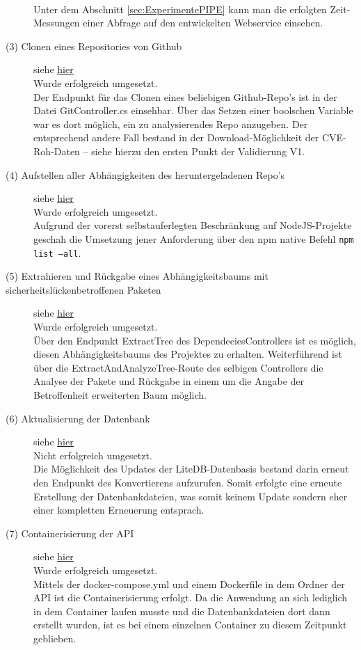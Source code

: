 \begin{description}
            \\
            Unter dem Abschnitt \ref{sec:ExperimentePIPE}  kann man die erfolgten Zeit-Messungen einer Abfrage auf den entwickelten Webservice einsehen.
        \item[(3) Clonen eines Repositories von Github] siehe \hyperref[f:three]{\underline{hier}} \hfill \\
            Wurde erfolgreich umgesetzt.
            \\
            Der Endpunkt für das Clonen eines beliebigen Github-Repo's ist in der Datei GitController.cs einsehbar.
            Über das Setzen einer boolschen Variable war es dort möglich, ein zu analysierendes Repo anzugeben.
            Der entsprechend andere Fall bestand in der Download-Möglichkeit der \ac{CVE}-Roh-Daten -- siehe hierzu den ersten Punkt der Validierung V1.
        \item[(4) Aufstellen aller Abhängigkeiten des heruntergeladenen Repo's] siehe \hyperref[f:four]{\underline{hier}} \hfill \\
            Wurde erfolgreich umgesetzt.
            \\
            Aufgrund der vorerst selbstauferlegten Beschränkung auf NodeJS-Projekte geschah die Umsetzung jener Anforderung über den npm native Befehl \texttt{npm list --all}.
        \item[(5) Extrahieren und Rückgabe eines Abhängigkeitsbaums mit sicher\-heits\-lücken\-betroffenen Paketen] siehe \hyperref[f:five]{\underline{hier}} \hfill \\
            Wurde erfolgreich umgesetzt.
            \\
            Über den Endpunkt ExtractTree des DependeciesControllers ist es möglich, diesen Abhängig\-keitsbaums des Projektes zu erhalten.
            Weiterführend ist über die ExtractAndAnalyzeTree-Route des selbigen Controllers die Analyse der Pakete und Rückgabe in einem um die Angabe der Betroffenheit erweiterten Baum möglich.
        \item[(6) Aktualisierung der Datenbank] siehe \hyperref[f:six]{\underline{hier}} \hfill \\
            Nicht erfolgreich umgesetzt.
            \\
            Die Möglichkeit des Updates der LiteDB-Datenbasis bestand darin erneut den Endpunkt des Konvertierens aufzurufen.
            Somit erfolgte eine erneute Erstellung der Datenbankdateien, was somit keinem Update sondern eher einer kompletten Erneuerung entsprach.
        \item[(7) Containerisierung der \ac{API}] siehe \hyperref[f:seven]{\underline{hier}} \hfill \\
            Wurde erfolgreich umgesetzt.
            \\
            Mittels der docker-compose.yml und einem Dockerfile in dem Ordner der API ist die Containerisierung erfolgt.
            Da die Anwendung an sich lediglich in dem Container laufen musste und die Datenbankdateien dort dann erstellt wurden, ist es bei einem einzelnen Container zu diesem Zeitpunkt geblieben.
    \end{description}

